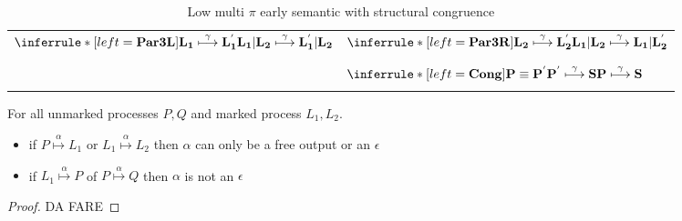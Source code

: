 \begin{definition}
\begin{table}
\begin{tabular}{ll}
	  $\inferrule* [left=\bf{Par3L}]{
	      L_{1} \stackrel{\gamma}{\longmapsto} L_{1}^{'}
	  }{
	      L_{1}|L_{2} \stackrel{\gamma}{\longmapsto} L_{1}^{'}|L_{2}
	  }$
	&
	  $\inferrule* [left=\bf{Par3R}]{
	      L_{2} \stackrel{\gamma}{\longmapsto} L_{2}^{'}
	  }{
	      L_{1}|L_{2} \stackrel{\gamma}{\longmapsto} L_{1}|L_{2}^{'}
	  }$
      \\\\\\
	&
	  $\inferrule* [left=\bf{Cong}]{
	      P\equiv P^{'}
	    \\
	      P^{'} \stackrel{\gamma}{\longmapsto} S
	  }{
	      P \stackrel{\gamma}{\longmapsto} S
	  }$
      \\\\\hline
    \end{tabular}
    \caption{Low multi $\pi$ early semantic with structural congruence}
    \label{lowleveltransitionrelation}
  \end{table}
\end{definition}

\begin{lemma}\label{lemmacom3}
  For all unmarked processes $P,Q$ and marked process $L_{1}, L_{2}$.
  \begin{itemize}
    \item
      if $P\stackrel{\alpha}{\longmapsto}L_{1}$ or $L_{1}\stackrel{\alpha}{\longmapsto}L_{2}$ then $\alpha$ can only be a free output or an $\epsilon$
    \item
      if $L_{1}\stackrel{\alpha}{\longmapsto}P$ of $P\stackrel{\alpha}{\longmapsto}Q$ then $\alpha$ is not an $\epsilon$
  \end{itemize}
  \begin{proof}
    DA FARE
  \end{proof}
\end{lemma}
